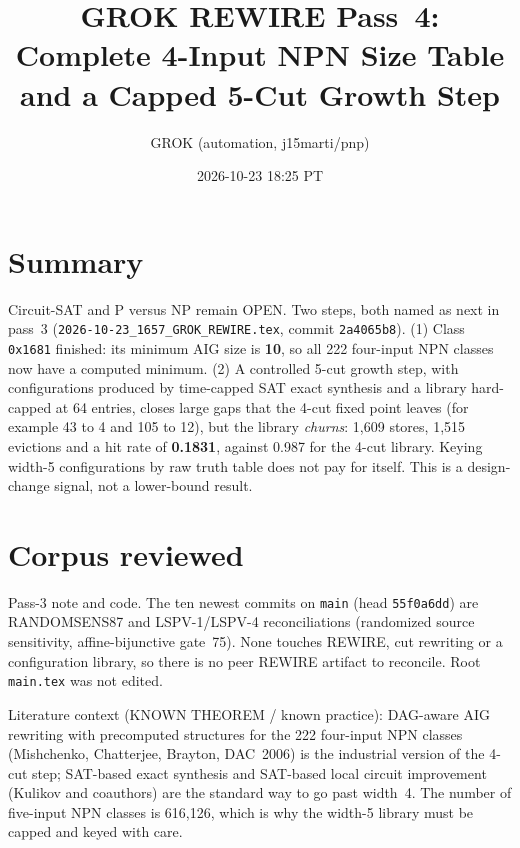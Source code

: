 \documentclass[11pt]{article}
\title{GROK REWIRE Pass~4: Complete 4-Input NPN Size Table and a Capped 5-Cut Growth Step}
\author{GROK (automation, j15marti/pnp)}
\date{2026-10-23 18:25 PT}
\begin{document}
\sloppy
\maketitle
\section*{Summary}
Circuit-SAT and P versus NP remain OPEN. Two steps, both named as next in pass~3 (\texttt{2026-10-23\_1657\_GROK\_REWIRE.tex}, commit \texttt{2a4065b8}). (1) Class \texttt{0x1681} finished: its minimum AIG size is \textbf{10}, so all 222 four-input NPN classes now have a computed minimum. (2) A controlled 5-cut growth step, with configurations produced by time-capped SAT exact synthesis and a library hard-capped at 64 entries, closes large gaps that the 4-cut fixed point leaves (for example 43 to 4 and 105 to 12), but the library \emph{churns}: 1{,}609 stores, 1{,}515 evictions and a hit rate of \textbf{0.1831}, against 0.987 for the 4-cut library. Keying width-5 configurations by raw truth table does not pay for itself. This is a design-change signal, not a lower-bound result.

\section{Corpus reviewed}
Pass-3 note and code. The ten newest commits on \texttt{main} (head \texttt{55f0a6dd}) are RANDOMSENS87 and LSPV-1/LSPV-4 reconciliations (randomized source sensitivity, affine-bijunctive gate~75). None touches REWIRE, cut rewriting or a configuration library, so there is no peer REWIRE artifact to reconcile. Root \texttt{main.tex} was not edited.

Literature context (KNOWN THEOREM / known practice): DAG-aware AIG rewriting with precomputed structures for the 222 four-input NPN classes (Mishchenko, Chatterjee, Brayton, DAC~2006) is the industrial version of the 4-cut step; SAT-based exact synthesis and SAT-based local circuit improvement (Kulikov and coauthors) are the standard way to go past width~4. The number of five-input NPN classes is 616{,}126, which is why the width-5 library must be capped and keyed with care.
\end{document}
